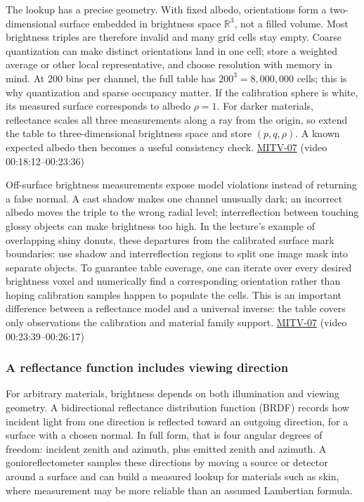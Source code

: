 The lookup has a precise geometry. With fixed albedo, orientations form a two-dimensional surface embedded in brightness space \(\mathbb R^3\), not a filled volume. Most brightness triples are therefore invalid and many grid cells stay empty. Coarse quantization can make distinct orientations land in one cell; store a weighted average or other local representative, and choose resolution with memory in mind. At 200 bins per channel, the full table has \(200^3=8{,}000{,}000\) cells; this is why quantization and sparse occupancy matter. If the calibration sphere is white, its measured surface corresponds to albedo \(\rho=1\). For darker materials, reflectance scales all three measurements along a ray from the origin, so extend the table to three-dimensional brightness space and store \((p,q,\rho)\). A known expected albedo then becomes a useful consistency check. \hyperref[04-visual-computing-ii-ch036]{MITV-07} (video 00:18:12--00:23:36)

Off-surface brightness measurements expose model violations instead of returning a false normal. A cast shadow makes one channel unusually dark; an incorrect albedo moves the triple to the wrong radial level; interreflection between touching glossy objects can make brightness too high. In the lecture's example of overlapping shiny donuts, these departures from the calibrated surface mark boundaries: use shadow and interreflection regions to split one image mask into separate objects. To guarantee table coverage, one can iterate over every desired brightness voxel and numerically find a corresponding orientation rather than hoping calibration samples happen to populate the cells. This is an important difference between a reflectance model and a universal inverse: the table covers only observations the calibration and material family support. \hyperref[04-visual-computing-ii-ch036]{MITV-07} (video 00:23:39--00:26:17)

\subsubsection{A reflectance function includes viewing direction}\label{a-reflectance-function-includes-viewing-direction}

For arbitrary materials, brightness depends on both illumination and viewing geometry. A bidirectional reflectance distribution function (BRDF) records how incident light from one direction is reflected toward an outgoing direction, for a surface with a chosen normal. In full form, that is four angular degrees of freedom: incident zenith and azimuth, plus emitted zenith and azimuth. A gonioreflectometer samples these directions by moving a source or detector around a surface and can build a measured lookup for materials such as skin, where measurement may be more reliable than an assumed Lambertian formula.

